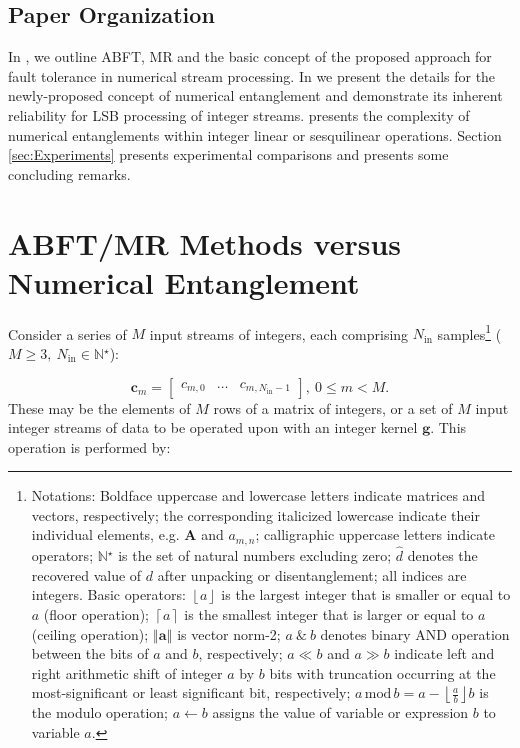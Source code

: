 \documentclass[twocolumn,english,onecolumn]{IEEEtran}
\theoremstyle{plain}
\theoremstyle{plain}
\begin{document}
\subsection{Paper Organization }

In , we outline ABFT, MR and
the basic concept of the proposed approach for fault tolerance in
numerical stream processing. In 
we present the details for the newly-proposed concept of numerical
entanglement and demonstrate its inherent reliability for LSB processing
of integer streams.  presents the
complexity of numerical entanglements within integer linear or sesquilinear
operations. Section \ref{sec:Experiments} presents experimental comparisons
and  presents some concluding remarks.


\section{ABFT/MR Methods versus Numerical Entanglement \label{sec:ABFT_MR_vs_Entanglement}}

Consider a series of $M$ input streams of integers, each comprising
$N_{\text{in}}$ samples\footnote{Notations: Boldface uppercase and lowercase letters indicate matrices
and vectors, respectively; the corresponding italicized lowercase
indicate their individual elements, e.g. $\mathbf{A}$ and $a_{m,n}$;
calligraphic uppercase letters indicate operators; $\mathbb{N}{}^{\star}$
is the set of natural numbers excluding zero; $\hat{d}$ denotes the
recovered value of $d$ after unpacking or disentanglement; all indices
are integers. Basic operators: $\left\lfloor a\right\rfloor $ is
the largest integer that is smaller or equal to $a$ (floor operation);
$\left\lceil a\right\rceil $ is the smallest integer that is larger
or equal to $a$ (ceiling operation); $\left\Vert \mathbf{a}\right\Vert $
is vector norm-2; $a\:\&\: b$ denotes binary AND operation between
the bits of $a$ and $b$, respectively; $a\ll b$ and $a\gg b$ indicate
left and right arithmetic shift of integer $a$ by $b$ bits with
truncation occurring at the most-significant or least significant
bit, respectively; $a\,\text{mod}\, b=a-\left\lfloor \frac{a}{b}\right\rfloor b$
is the modulo operation; $a\leftarrow b$ assigns the value of variable
or expression $b$ to variable $a$. } ($M\geq3,\: N_{\text{in}}\in\mathfrak{\mathbb{N}{}^{\star}}$): 

\begin{equation}
\mathbf{c}_{m}=\begin{bmatrix}c_{m,0} & \ldots & c_{m,N_{\text{in}}-1}\end{bmatrix},\:0\leq m<M.\label{eq:M_input_data_streams}
\end{equation}
These may be the elements of $M$ rows of a matrix of integers, or
a set of $M$ input integer streams of data to be operated upon with
an integer kernel $\mathbf{g}$. This operation is performed by:
\end{document}

